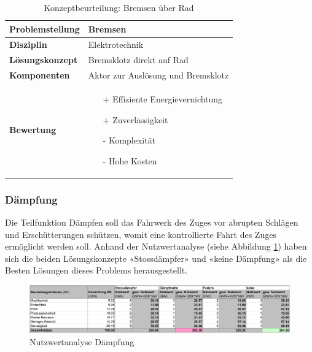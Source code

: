 \documentclass[../../main.tex]{subfiles}
\begin{document}
\begin{flushleft}
    \begin{table}[h]
    \begin{tabular}{ | l | p{11cm} |}
    \hline
    \textbf{Problemstellung} & Bremsen \\ \hline
    \textbf{Disziplin} & Elektrotechnik \\ \hline
    \textbf{Lösungskonzept} & Bremsklotz direkt auf Rad \\ \hline
    \textbf{Komponenten} & Aktor zur Auslösung und Bremsklotz \\ \hline
    \textbf{Bewertung} &  \begin{itemize}
                            \item[+] Effiziente Energievernichtung
                            \item[+] Zuverlässigkeit
                            \item[-] Komplexität 
                            \item[-] Hohe Kosten
                          \end{itemize} \\ \hline
    \end{tabular}
    \caption{Konzeptbeurteilung: Bremsen über Rad}
    \label{tab:konzept_fahrwerk_radbremse}
\end{table}
\end{flushleft}

  \subsubsection{Dämpfung}
  Die Teilfunktion Dämpfen soll das Fahrwerk des Zuges vor abrupten Schlägen und Erschütterungen schützen, womit eine kontrollierte Fahrt des Zuges ermöglicht werden soll. Anhand der Nutzwertanalyse (siehe Abbildung \ref{fig:Daempfung}) haben sich die beiden Lösungskonzepte «Stossdämpfer» und «keine Dämpfung» als die Besten Lösungen dieses Problems herausgestellt.

  \begin{figure}[H] %
    \centering
    \includegraphics[width=1\textwidth]{Daempfung}
    \caption{Nutzwertanalyse Dämpfung}
    \label{fig:Daempfung}
\end{figure}
\end{document}
